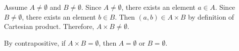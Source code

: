 \begin{enumerate}
\begin{enumerate}
\begin{subprove}
      Assume $A \neq \emptyset$ and $B \neq \emptyset$.
      Since $A \neq \emptyset$, there exists an element $a \in A$.
      Since $B \neq \emptyset$, there exists an element $b \in B$.
      Then $(a,b) \in A \times B$ by definition of Cartesian product.
      Therefore, $A \times B \neq \emptyset$.
      
      By contrapositive, if $A \times B = \emptyset$, then $A = \emptyset$ or $B = \emptyset$.
    \end{subprove}
  \end{enumerate}

\end{enumerate}